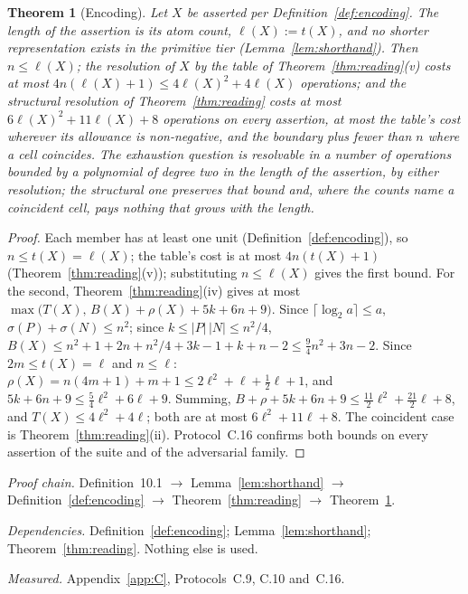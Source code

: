 \documentclass[pdflatex,sn-mathphys-num]{sn-jnl}
\theoremstyle{thmstyleone}%
\newtheorem{theorem}{Theorem}[section]
\theoremstyle{thmstyletwo}%
\theoremstyle{thmstylethree}%
\newtheorem{theorem}{Theorem}[section]
\newcommand{\deps}[1]{\par\begin{sloppypar}\noindent\emph{Dependencies.} #1 Nothing else is used.\end{sloppypar}}
\newcommand{\chain}[1]{\par\begin{sloppypar}\noindent\emph{Proof chain.} #1\end{sloppypar}}
\newcommand{\measured}[1]{\par\begin{sloppypar}\noindent\emph{Measured.} #1\end{sloppypar}}
\begin{document}
\begin{theorem}[Encoding]\label{thm:encoding}
Let $X$ be asserted per Definition~\ref{def:encoding}. The length of the assertion is its atom count, $\ell(X):=t(X)$, and no shorter representation exists in the primitive tier (Lemma~\ref{lem:shorthand}). Then $n\le\ell(X)$; the resolution of $X$ by the table of Theorem~\ref{thm:reading}(v) costs at most $4n(\ell(X)+1)\le4\ell(X)^2+4\ell(X)$ operations; and the structural resolution of Theorem~\ref{thm:reading} costs at most $6\ell(X)^2+11\ell(X)+8$ operations on every assertion, at most the table's cost wherever its allowance is non-negative, and the boundary plus fewer than $n$ where a cell coincides. The exhaustion question is resolvable in a number of operations bounded by a polynomial of degree two in the length of the assertion, by either resolution; the structural one preserves that bound and, where the counts name a coincident cell, pays nothing that grows with the length.
\end{theorem}
\begin{proof}
Each member has at least one unit (Definition~\ref{def:encoding}), so $n\le t(X)=\ell(X)$; the table's cost is at most $4n(t(X)+1)$ (Theorem~\ref{thm:reading}(v)); substituting $n\le\ell(X)$ gives the first bound. For the second, Theorem~\ref{thm:reading}(iv) gives at most $\max\bigl(T(X),\,B(X)+\rho(X)+5k+6n+9\bigr)$. Since $\lceil\log_2 a\rceil\le a$, $\sigma(P)+\sigma(N)\le n^2$; since $k\le|P|\,|N|\le n^2/4$, $B(X)\le n^2+1+2n+n^2/4+3k-1+k+n-2\le\tfrac94n^2+3n-2$. Since $2m\le t(X)=\ell$ and $n\le\ell$: $\rho(X)=n(4m+1)+m+1\le2\ell^2+\ell+\tfrac12\ell+1$, and $5k+6n+9\le\tfrac54\ell^2+6\ell+9$. Summing, $B+\rho+5k+6n+9\le\tfrac{11}{2}\ell^2+\tfrac{21}{2}\ell+8$, and $T(X)\le4\ell^2+4\ell$; both are at most $6\ell^2+11\ell+8$. The coincident case is Theorem~\ref{thm:reading}(ii). Protocol~C.16 confirms both bounds on every assertion of the suite and of the adversarial family.
\end{proof}
\chain{Definition~10.1 $\to$ Lemma~\ref{lem:shorthand} $\to$ Definition~\ref{def:encoding} $\to$ Theorem~\ref{thm:reading} $\to$ Theorem~\ref{thm:encoding}.}
\deps{Definition~\ref{def:encoding}; Lemma~\ref{lem:shorthand}; Theorem~\ref{thm:reading}.}
\measured{Appendix~\ref{app:C}, Protocols~C.9, C.10 and~C.16.}
\end{document}

